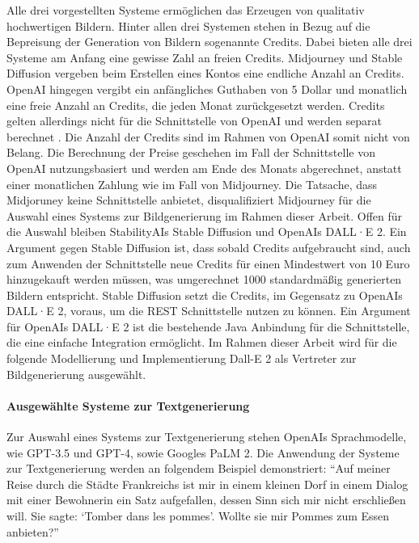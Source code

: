 Alle drei vorgestellten Systeme ermöglichen das Erzeugen von qualitativ hochwertigen Bildern.
Hinter allen drei Systemen stehen in Bezug auf die Bepreisung der Generation von Bildern sogenannte Credits.
Dabei bieten alle drei Systeme am Anfang eine gewisse Zahl an freien Credits.
Midjourney und Stable Diffusion vergeben beim Erstellen eines Kontos eine endliche Anzahl an Credits.
OpenAI hingegen vergibt ein anfängliches Guthaben von 5 Dollar und monatlich eine freie Anzahl an Credits, die jeden Monat zurückgesetzt werden.
Credits gelten allerdings nicht für die Schnittstelle von OpenAI und werden separat berechnet \cite{openai-dall-e-seperate-billing}.
Die Anzahl der Credits sind im Rahmen von OpenAI somit nicht von Belang.
Die Berechnung der Preise geschehen im Fall der Schnittstelle von OpenAI nutzungsbasiert und werden am Ende des Monats abgerechnet, anstatt einer monatlichen Zahlung wie im Fall von Midjourney.
Die Tatsache, dass Midjoruney keine Schnittstelle anbietet, disqualifiziert Midjourney für die Auswahl eines Systems zur Bildgenerierung im Rahmen dieser Arbeit.
Offen für die Auswahl bleiben StabilityAIs Stable Diffusion und OpenAIs DALL·E 2.
Ein Argument gegen Stable Diffusion ist, dass sobald Credits aufgebraucht sind, auch zum Anwenden der Schnittstelle neue Credits für einen Mindestwert von 10 Euro hinzugekauft werden müssen, was umgerechnet 1000 standardmäßig generierten Bildern entspricht.
Stable Diffusion setzt die Credits, im Gegensatz zu OpenAIs DALL·E 2, voraus, um die REST Schnittstelle nutzen zu können.
Ein Argument für OpenAIs DALL·E 2 ist die bestehende Java Anbindung für die Schnittstelle, die eine einfache Integration ermöglicht.
Im Rahmen dieser Arbeit wird für die folgende Modellierung und Implementierung Dall-E 2 als Vertreter zur Bildgenerierung ausgewählt.

\paragraph{Ausgewählte Systeme zur Textgenerierung}
Zur Auswahl eines Systems zur Textgenerierung stehen OpenAIs Sprachmodelle, wie GPT-3.5 und GPT-4, sowie Googles PaLM 2.
Die Anwendung der Systeme zur Textgenerierung werden an folgendem Beispiel demonstriert: \enquote{Auf meiner Reise durch die Städte Frankreichs ist mir in einem kleinen Dorf in einem Dialog mit einer Bewohnerin ein Satz aufgefallen, dessen Sinn sich mir nicht erschließen will. Sie sagte: \enquote{Tomber dans les pommes}. Wollte sie mir Pommes zum Essen anbieten?}

